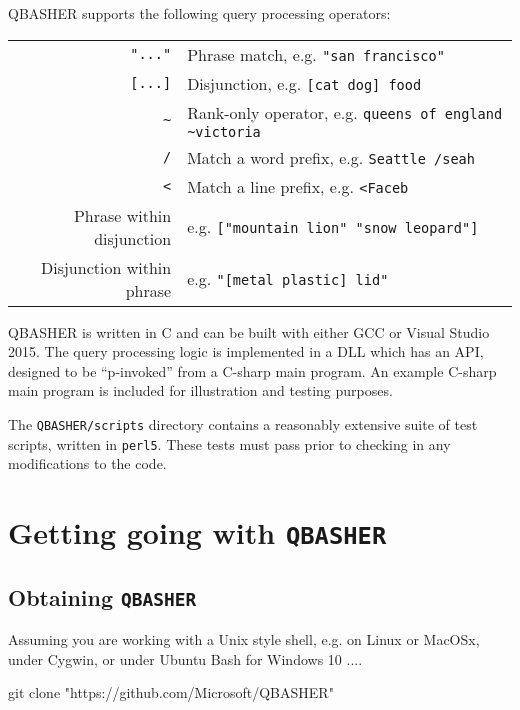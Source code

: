 \documentclass{article}
\newcommand{\projectName}{\texttt{QBASHER}}
\begin{document}
    

QBASHER supports the following query processing operators:

\vspace{3mm}
\begin{tabular}{|r|l|}
  \hline
\texttt{"..."}& Phrase match, e.g. \texttt{"san francisco"} \\
\texttt{[...]}& Disjunction, e.g. \texttt{[cat dog] food}\\
\texttt{\~}& Rank-only operator, e.g. \verb|queens of england ~victoria|\\
\texttt{/}& Match a word prefix, e.g. \texttt{Seattle /seah}\\
\verb|<|& Match a line prefix, e.g. \texttt{<Faceb}\\
Phrase within disjunction& e.g. \texttt{["mountain lion" "snow
    leopard"]} \\
Disjunction within phrase& e.g. \texttt{"[metal plastic] lid"}\\
\hline
\end{tabular}
\vspace{3mm}

QBASHER is written in C and can be built with either GCC or Visual
Studio 2015.  The query processing logic is implemented in a DLL
which has an API, designed to be ``p-invoked'' from a C-sharp main program.
An example C-sharp main program is included for illustration and testing
purposes.

The \texttt{QBASHER/scripts} directory contains a reasonably
extensive suite of test scripts, written in \texttt{perl5}.  These
tests must pass prior to checking in any modifications to the code.



\section{Getting going with \projectName}

\subsection{Obtaining \projectName}

Assuming you are working with a Unix style shell, e.g. on Linux or MacOSx,
under Cygwin, or under Ubuntu Bash for Windows 10 ....

\begin{verb}
git clone "https://github.com/Microsoft/QBASHER"
\end{verb}
\end{document}
